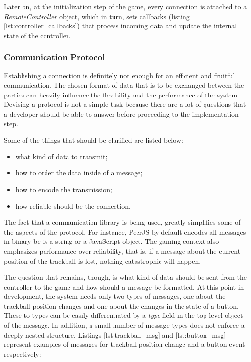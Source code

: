Later on, at the initialization step of the game, every connection is attached
to a \emph{RemoteController} object, which in turn, sets callbacks (listing
\ref{lst:controller_callbacks}) that process incoming data and update the
internal state of the controller.




\subsubsection{Communication Protocol}

Establishing a connection is definitely not enough for an efficient and fruitful
communication. The chosen format of data that is to be exchanged between the
parties can heavily influence the flexibility and the performance of the system.
Devising a protocol is not a simple task because there are a lot of questions
that a developer should be able to answer before proceeding to the
implementation step.

Some of the things that should be clarified are listed below:

\begin{itemize}
\item what kind of data to transmit;
\item how to order the data inside of a message;
\item how to encode the transmission;
\item how reliable should be the connection.
\end{itemize}

The fact that a communication library is being used, greatly simplifies some of
the aspects of the protocol. For instance, PeerJS by default encodes all
messages in binary be it a string or a JavaScript object. The gaming context
also emphasizes performance over reliability, that is, if a message about the
current position of the trackball is lost, nothing catastrophic will happen.

The question that remains, though, is what kind of data should be sent from the
controller to the game and how should a message be formatted. At this point in
development, the system needs only two types of messages, one about the
trackball position changes and one about the changes in the state of a button.
These to types can be easily differentiated by a \emph{type} field in the top
level object of the message. In addition, a small number of message types does
not enforce a deeply nested structure. Listings \ref{lst:trackball_msg} and
\ref{lst:button_msg} represent examples of messages for trackball position
change and a button event respectively:

